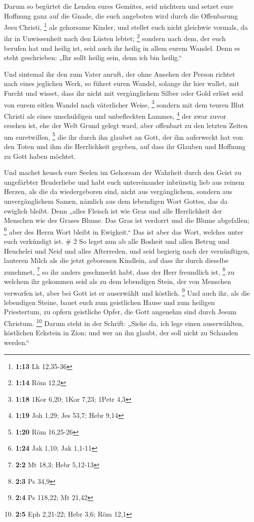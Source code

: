  Darum so begürtet die Lenden eures Gemütes, seid nüchtern
und setzet eure Hoffnung ganz auf die Gnade, die euch angeboten wird
durch die Offenbarung Jesu Christi, \footnote{\textbf{1:13} Lk 12,35-36}
 als gehorsame Kinder, und stellet euch nicht gleichwie
vormals, da ihr in Unwissenheit nach den Lüsten lebtet; \footnote{\textbf{1:14}
  Röm 12,2}  sondern nach dem, der euch berufen hat und
heilig ist, seid auch ihr heilig in allem eurem Wandel. 
Denn es steht geschrieben: „Ihr sollt heilig sein, denn ich bin
heilig.``

 Und sintemal ihr den zum Vater anruft, der ohne Ansehen
der Person richtet nach eines jeglichen Werk, so führet euren Wandel,
solange ihr hier wallet, mit Furcht  und wisset, dass ihr
nicht mit vergänglichem Silber oder Gold erlöst seid von eurem eitlen
Wandel nach väterlicher Weise, \footnote{\textbf{1:18} 1Kor 6,20; 1Kor
  7,23; 1Petr 4,3}  sondern mit dem teuren Blut Christi als
eines unschuldigen und unbefleckten Lammes, \footnote{\textbf{1:19} Joh
  1,29; Jes 53,7; Hebr 9,14}  der zwar zuvor ersehen ist,
ehe der Welt Grund gelegt ward, aber offenbart zu den letzten Zeiten um
euretwillen, \footnote{\textbf{1:20} Röm 16,25-26}  die ihr
durch ihn glaubet an Gott, der ihn auferweckt hat von den Toten und ihm
die Herrlichkeit gegeben, auf dass ihr Glauben und Hoffnung zu Gott
haben möchtet.

 Und machet keusch eure Seelen im Gehorsam der Wahrheit
durch den Geist zu ungefärbter Bruderliebe und habt euch untereinander
inbrünstig lieb aus reinem Herzen,  als die da
wiedergeboren sind, nicht aus vergänglichem, sondern aus unvergänglichem
Samen, nämlich aus dem lebendigen Wort Gottes, das da ewiglich bleibt.
 Denn „alles Fleisch ist wie Gras und alle Herrlichkeit der
Menschen wie des Grases Blume. Das Gras ist verdorrt und die Blume
abgefallen; \footnote{\textbf{1:24} Jak 1,10; Jak 1,1-11} 
aber des Herrn Wort bleibt in Ewigkeit.`` Das ist aber das Wort, welches
unter euch verkündigt ist. \# 2  So leget nun ab alle
Bosheit und allen Betrug und Heuchelei und Neid und alles Afterreden,
 und seid begierig nach der vernünftigen, lauteren Milch als
die jetzt geborenen Kindlein, auf dass ihr durch dieselbe zunehmet,
\footnote{\textbf{2:2} Mt 18,3; Hebr 5,12-13}  so ihr anders
geschmeckt habt, dass der Herr freundlich ist, \footnote{\textbf{2:3} Ps
  34,9}  zu welchem ihr gekommen seid als zu dem lebendigen
Stein, der von Menschen verworfen ist, aber bei Gott ist er auserwählt
und köstlich. \footnote{\textbf{2:4} Ps 118,22; Mt 21,42} 
Und auch ihr, als die lebendigen Steine, bauet euch zum geistlichen
Hause und zum heiligen Priestertum, zu opfern geistliche Opfer, die Gott
angenehm sind durch Jesum Christum. \footnote{\textbf{2:5} Eph 2,21-22;
  Hebr 3,6; Röm 12,1}  Darum steht in der Schrift: „Siehe
da, ich lege einen auserwählten, köstlichen Eckstein in Zion; und wer an
ihn glaubt, der soll nicht zu Schanden werden.``

